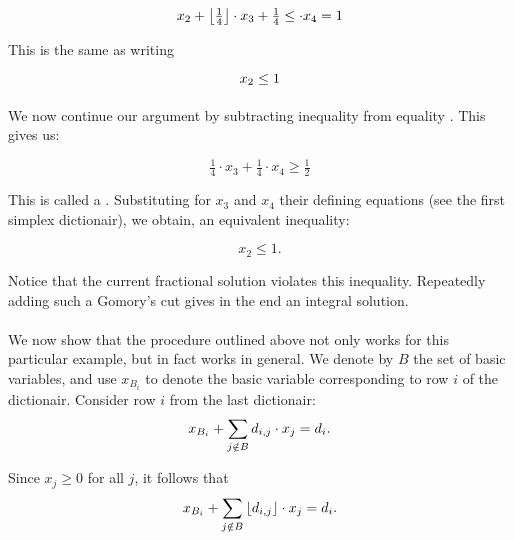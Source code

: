 \begin{example}
\begin{equation}
x_2+\floor{\tfrac{1}{4}}\cdot x_3+\tfrac{1}{4}\leq\cdot x_4=1
\end{equation}

This is the same as writing

\begin{equation}
x_2\leq 1\eqnlab{cg-cut-eq2-fin}
\end{equation}

\paragraph{}
We now continue our argument by subtracting inequality  from equality . This gives us:

\begin{equation}
\tfrac{1}{4}\cdot x_3+\tfrac{1}{4}\cdot x_4\geq\tfrac{1}{2}
\end{equation}

This is called a . Substituting for $x_3$ and $x_4$ their defining equations (see the first simplex dictionair), we obtain, an equivalent inequality:

\begin{equation}
x_2\leq 1.
\end{equation}
\end{example}

\begin{note}
Notice that the current fractional solution violates this inequality. Repeatedly adding such a Gomory's cut gives in the end an integral solution.
\end{note}

\paragraph{}
We now show that the procedure outlined above not only works for this particular example, but in fact works in general. We denote by $B$ the set of basic variables, and use $x_{B_i}$ to denote the basic variable corresponding to row $i$ of the dictionair. Consider row $i$ from the last dictionair:
\begin{equation}
x_{B_i}+\sumndomain[j]{B}{d_{i,j}\cdot x_j}=d_i.\eqnlab{gc-theory1}
\end{equation}

Since $x_j\geq 0$ for all $j$, it follows that 
\begin{equation}
x_{B_i}+\sumndomain[j]{B}{\floor{d_{i,j}}\cdot x_j}=d_i.
\end{equation}

